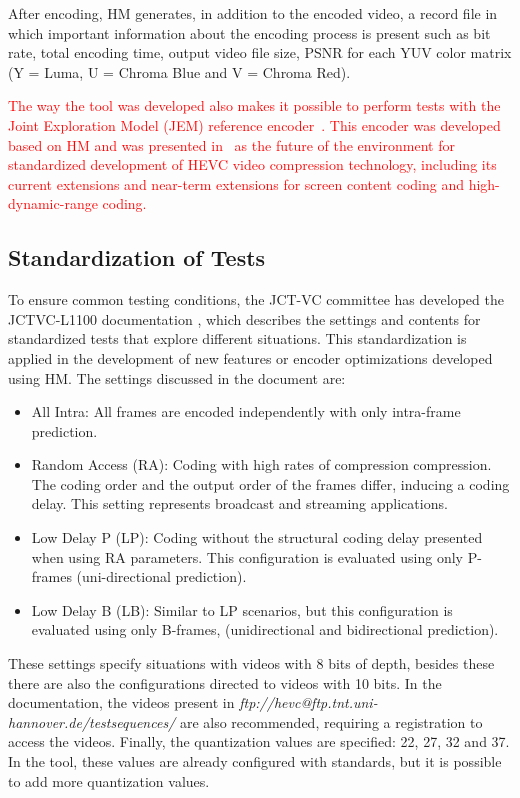\documentclass{acm_proc_article-sp}
\begin{document}
After encoding, HM generates, in addition to the encoded video, a record file in which important information about the encoding process is present such as bit rate, total encoding time, output video file size, PSNR for each YUV color matrix (Y = Luma, U = Chroma Blue and V = Chroma Red).

\textcolor{red}{
The way the tool was developed also makes it possible to perform tests with the Joint Exploration Model (JEM) reference encoder~\cite{Bossen:17}. This encoder was developed based on HM and was presented in~\cite{JVET:2015} as the future of the environment for standardized development of HEVC video compression technology, including its current extensions and near-term extensions for screen content coding and high-dynamic-range coding.
}


\subsection{Standardization of Tests}

To ensure common testing conditions, the JCT-VC committee has developed the JCTVC-L1100 documentation \cite{Bossen:13}, which describes the settings and contents for standardized tests that explore different situations. This standardization is applied in the development of new features or encoder optimizations developed using HM. The settings discussed in the document are:

\begin{itemize}

  \item All Intra: All frames are encoded independently with only intra-frame prediction.
  \item Random Access (RA): Coding with high rates of compression compression. The coding order and the output order of the frames differ, inducing a coding delay. This setting represents broadcast and streaming applications.
  \item Low Delay P (LP): Coding without the structural coding delay presented when using RA parameters. This configuration is evaluated using only P-frames (uni-directional prediction).
  \item Low Delay B (LB): Similar to LP scenarios, but this configuration is evaluated using only B-frames, (unidirectional and bidirectional prediction).

\end{itemize}

These settings specify situations with videos with 8 bits of depth, besides these there are also the configurations directed to videos with 10 bits. In the documentation, the videos present in \emph{ftp://hevc@ftp.tnt.uni-hannover.de/testsequences/} are also recommended, requiring a registration to access the videos. Finally, the quantization values are specified: 22, 27, 32 and 37. In the tool, these values are already configured with standards, but it is possible to add more quantization values.
\end{document}
